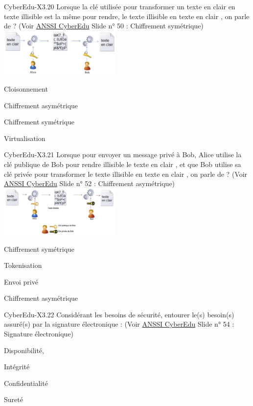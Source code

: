 \begin{multi}[multiple=true]{CyberEdu-X3.20}
	Lorsque la clé utilisée pour transformer un texte  en clair  en texte illisible est la même pour rendre, le texte  illisible  en texte  en clair , on parle de ? (Voir \href{https://www.ssi.gouv.fr/administration/formations/cyberedu/contenu-pedagogique-cyberedu/}{ANSSI CyberEdu} Slide n° 50 : Chiffrement symétrique)
	\includegraphics[width=6cm]{../Latex/Sources/EXTERNAL/ANSSI/QuizzCyberEdu/img/img3-20.png}
\item Cloisonnement
\item Chiffrement asymétrique
\item* Chiffrement symétrique
\item Virtualisation
 \end{multi}
\begin{multi}[multiple=true]{CyberEdu-X3.21}
	Lorsque pour envoyer un message privé à Bob, Alice utilise la clé  publique de Bob pour rendre   illisible  le  texte en clair , et que Bob utilise sa clé privée pour transformer le texte  illisible  en   texte en clair , on parle de ? (Voir \href{https://www.ssi.gouv.fr/administration/formations/cyberedu/contenu-pedagogique-cyberedu/}{ANSSI CyberEdu} Slide n° 52 : Chiffrement asymétrique)
		\includegraphics[width=6cm]{../Latex/Sources/EXTERNAL/ANSSI/QuizzCyberEdu/img/img3-21.png}
\item Chiffrement symétrique
\item Tokenisation
\item Envoi privé
\item* Chiffrement asymétrique
\end{multi}
\begin{multi}[multiple=true]{CyberEdu-X3.22}
	Considérant les besoins de sécurité, entourer le(s) besoin(s) assuré(s) par la signature électronique : (Voir \href{https://www.ssi.gouv.fr/administration/formations/cyberedu/contenu-pedagogique-cyberedu/}{ANSSI CyberEdu} Slide n° 54 : Signature électronique)
\item Disponibilité,
\item* Intégrité
\item Confidentialité
\item Sureté
\end{multi}
